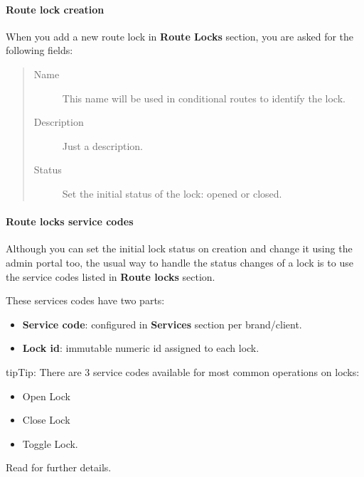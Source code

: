 \documentclass[letterpaper,10pt,english]{sphinxmanual}
\begin{document}
\paragraph{Route lock creation}
\label{administration_portal/client/vpbx/routing_tools/route_locks:route-lock-creation}
When you add a new route lock in \textbf{Route Locks} section, you are asked for the following fields:
\begin{quote}
\begin{description}
\item[{Name}] \leavevmode
This name will be used in conditional routes to identify the lock.

\item[{Description}] \leavevmode
Just a description.

\item[{Status}] \leavevmode
Set the initial status of the lock: opened or closed.

\end{description}
\end{quote}


\paragraph{Route locks service codes}
\label{administration_portal/client/vpbx/routing_tools/route_locks:route-locks-service-codes}
Although you can set the initial lock status on creation and change it using the admin portal too, the usual way to
handle the status changes of a lock is to use the service codes listed in \textbf{Route locks} section.

These services codes have two parts:
\begin{itemize}
\item {} 
\textbf{Service code}: configured in \textbf{Services} section per brand/client.

\item {} 
\textbf{Lock id}: immutable numeric id assigned to each lock.

\end{itemize}

\begin{notice}{tip}{Tip:}
There are 3 service codes available for most common operations on locks:
\begin{itemize}
\item {} 
Open Lock

\item {} 
Close Lock

\item {} 
Toggle Lock.

\end{itemize}

Read {\hyperref[administration_portal/client/vpbx/services:services]{}} for further details.
\end{notice}
\end{document}
